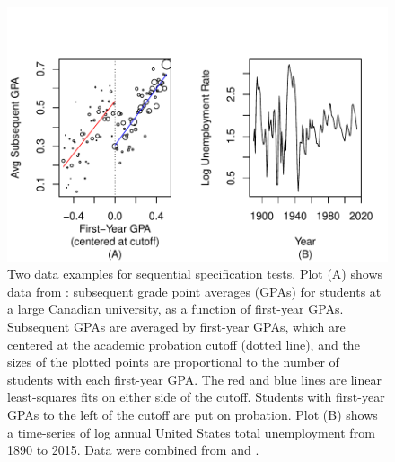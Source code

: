 \documentclass[lineno]{biometrika}\usepackage[]{graphicx}\usepackage[]{color}
\makeatletter
\def\maxwidth{ %
  \ifdim\Gin@nat@width>\linewidth
    \linewidth
  \else
    \Gin@nat@width
  \fi
}
\makeatother
\begin{document}
\begin{figure}

\includegraphics[width=\maxwidth]{figure/examplePlots-1}

\caption{Two data examples for sequential specification tests. Plot (A) shows data from
  \citet{lso}: subsequent grade point averages (GPAs) for students
  at a large Canadian university, as a function of first-year
  GPAs. Subsequent GPAs are averaged by first-year GPAs, which are
  centered at the academic probation cutoff (dotted line), and the sizes
  of the plotted points are proportional to the number of students
  with each first-year GPA. The red and blue lines are linear least-squares
  fits on either side of the cutoff. Students with first-year GPAs
  to the left of  the cutoff are put on probation. Plot (B) shows a
  time-series of log annual United States total unemployment from 1890 to
  2015. Data were combined from \citet{urca} and \citet{cps}.}
\label{fig:example}
\end{figure}
\end{document}
